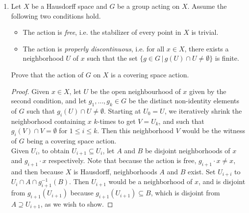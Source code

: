 \documentclass{article}
\begin{document}
\begin{enumerate}
\begin{proof}
      Finally, we show that $X$ is Hausdorff. Let $x_1$, $x_2$ be two
      distinct points in $X$. Let $\mathcal{O}_1$, $\mathcal{O}_2$ be open
      sets containing $x_1$ and $x_2$ respectively given by the definition
      of the covering space property of $\pi$. For $i=1,2$, let
      $\mathcal{U}_i\subseteq\pi^{-1}(\mathcal{O}_i)$ be one of the open
      sets of $\tilde{X}$ that is homeomorphic to $\mathcal{O}_i$ under the
      restriction map of $\pi$. Let $\tilde{x_i}\in\mathcal{U}_i$ be the
      pre-image of $x_i$. Then $\tilde{x_1}$ and $\tilde{x_2}$ are
      distinct, so by Hausdorff property of $\tilde{X}$, they must be
      contained in disjoint open sets $\mathcal{U}_1'$ and $\mathcal{U}_2'$
      respectively. For $i=1,2$, let
      $\mathcal{O}_i'=\pi(\mathcal{U}_i\cap\mathcal{U}_i')$. Then since the
      restriction of $\pi$ to $\mathcal{U}_i$ is a homeomorphism,
      $\mathcal{O}_i'$ is an open set containing $x_i$. Also, from
      disjointness of $\mathcal{U}_0'$ and $\mathcal{U}_1'$,
      $\mathcal{O}_0'$ and $\mathcal{O}_1'$ must also be disjoint, which
      completes our proof that $X$ is Hausdorff.
    \end{proof}

  \item Let $X$ be a Hausdorff space and $G$ be a group acting on $X$.
    Assume the following two conditions hold.
    \begin{itemize}
      \item The action is \textit{free}, i.e. the stabilizer of every point
        in $X$ is trivial.
      \item The action is \textit{properly discontinuous}, i.e. for all
        $x\in X$, there exists a neighborhood $U$ of $x$ such that the set
        $\{g\in G\,|\, g(U)\cap U\neq\emptyset\}$ is finite.
    \end{itemize}
    Prove that the action of $G$ on $X$ is a covering space action.

    \begin{proof}
      Given $x\in X$, let $U$ be the open neighbourhood of $x$ given by the
      second condition, and let $g_1,\ldots,g_k\in G$ be the distinct
      non-identity elements of $G$ such that $g_i(U)\cap U\neq\emptyset$.
      Starting at $U_0=U$, we iteratively shrink the neighborhood
      containing $x$ $k$-times to get $V=U_k$, and such that $g_i(V)\cap
      V=\emptyset$ for $1\leq i\leq k$. Then this neighborhood $V$ would be
      the witness of $G$ being a covering space action. \\

      Given $U_i$, to obtain $U_{i+1}\subseteq U_i$, let $A$ and $B$ be
      disjoint neighborhoods of $x$ and $g_{i+1}\cdot x$ respectively. Note
      that because the action is free, $g_{i+1}\cdot x\neq x$, and then
      because $X$ is Hausdorff, neighborhoods $A$ and $B$ exist. Set
      $U_{i+i}$ to $U_i\cap A\cap g_{i+1}^{-1}(B)$. Then $U_{i+1}$ would
      be a neighborhood of $x$, and is disjoint from $g_{i+1}(U_{i+1})$
      because $g_{i+1}(U_{i+1})\subseteq B$, which is disjoint from
      $A\supseteq U_{i+1}$, as we wish to show.
    \end{proof}
\end{enumerate}
\end{document}
